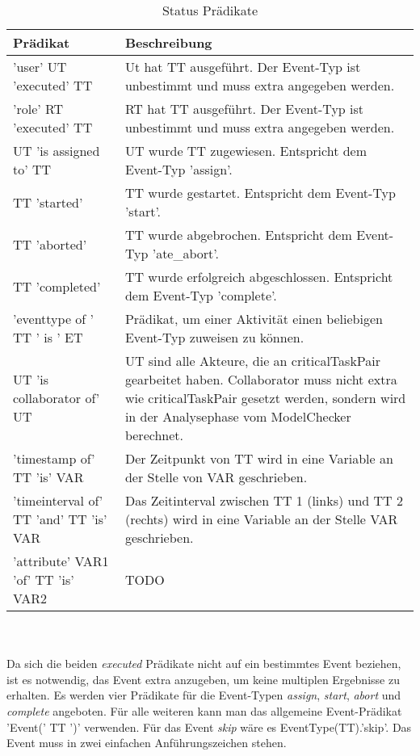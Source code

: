 \begin{table}[h]
\begin{tabular} {|p{6cm}|p{10cm}|}
\hline
\textbf{Prädikat} & \textbf{Beschreibung}\\
\hline
'user' UT 'executed' TT      & Ut hat TT ausgeführt. Der Event-Typ ist unbestimmt und muss extra angegeben werden.\\
\hline
'role' RT 'executed' TT		& RT hat TT ausgeführt. Der Event-Typ ist unbestimmt und muss extra angegeben werden.\\
\hline
UT 'is assigned to' TT		& UT wurde TT zugewiesen. Entspricht dem Event-Typ 'assign'.\\
\hline
TT 'started'			& TT wurde gestartet. Entspricht dem Event-Typ 'start'.\\
\hline
TT 'aborted'			& TT wurde abgebrochen. Entspricht dem Event-Typ 'ate\_abort'.\\
\hline
TT 'completed'			& TT wurde erfolgreich abgeschlossen. Entspricht dem Event-Typ 'complete'. \\
\hline
'eventtype of ' TT ' is ' ET 	& Prädikat, um einer Aktivität einen beliebigen Event-Typ zuweisen zu können.\\
\hline
UT 'is collaborator of' UT	& UT sind alle Akteure, die an criticalTaskPair gearbeitet haben. Collaborator muss nicht extra wie criticalTaskPair gesetzt werden, sondern wird in der Analysephase vom ModelChecker berechnet.\\
\hline
'timestamp of' TT 'is' VAR	& Der Zeitpunkt von TT wird in eine Variable an der Stelle von VAR geschrieben.\\
\hline
'timeinterval of' TT 'and' TT 'is' VAR 	& Das Zeitinterval zwischen TT 1 (links) und TT 2 (rechts) wird in eine Variable an der Stelle VAR geschrieben.\\
\hline
'attribute' VAR1 'of' TT 'is' VAR2 & TODO\\
\hline	
\end{tabular}
\\\\\small Da sich die beiden \textit{executed} Prädikate nicht auf ein bestimmtes Event beziehen, ist es notwendig, das Event extra anzugeben, um keine multiplen Ergebnisse zu erhalten. Es werden vier Prädikate für die Event-Typen \textit{assign}, \textit{start}, \textit{abort} und \textit{complete} angeboten. Für alle weiteren kann man das allgemeine Event-Prädikat 'Event(' TT ')' verwenden. Für das Event \textit{skip} wäre es EventType(TT).'skip'. Das Event muss in zwei einfachen Anführungszeichen stehen.
\caption{Status Prädikate}
\label{tab:status}
\end{table}

